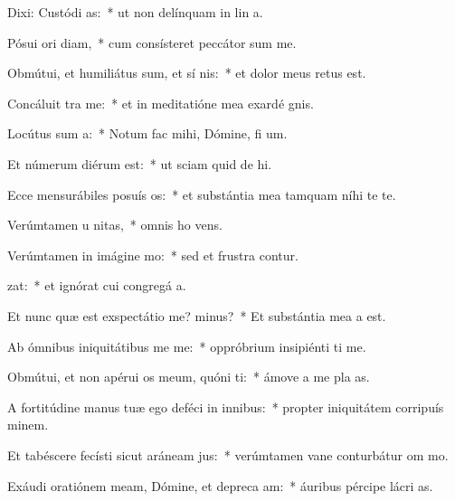 \item Dixi: Custódi  as:~* ut non delínquam in lin a.
\item Pósui ori  diam,~* cum consísteret peccátor sum me.
\item Obmútui, et humiliátus sum, et sí  nis:~* et dolor meus retus est.
\item Concáluit   tra me:~* et in meditatióne mea exardé gnis.
\item Locútus sum   a:~* Notum fac mihi, Dómine, fi um.
\item Et númerum diérum   est:~* ut sciam quid de hi.
\item Ecce mensurábiles posuís  os:~* et substántia mea tamquam níhi te te.
\item Verúmtamen u nitas,~* omnis ho vens.
\item Verúmtamen in imágine  mo:~* sed et frustra contur.
\item {}zat:~* et ignórat cui congregá a.
\item Et nunc quæ est exspectátio me?  minus?~* Et substántia mea a  est.
\item Ab ómnibus iniquitátibus me  me:~* oppróbrium insipiénti ti me.
\item Obmútui, et non apérui os meum, quóni  ti:~* ámove a me pla as.
\item A fortitúdine manus tuæ ego deféci in innibus:~* propter iniquitátem corripuís minem.
\item Et tabéscere fecísti sicut aráneam  jus:~* verúmtamen vane conturbátur om mo.
\item Exáudi oratiónem meam, Dómine, et depreca am:~* áuribus pércipe lácri as.

